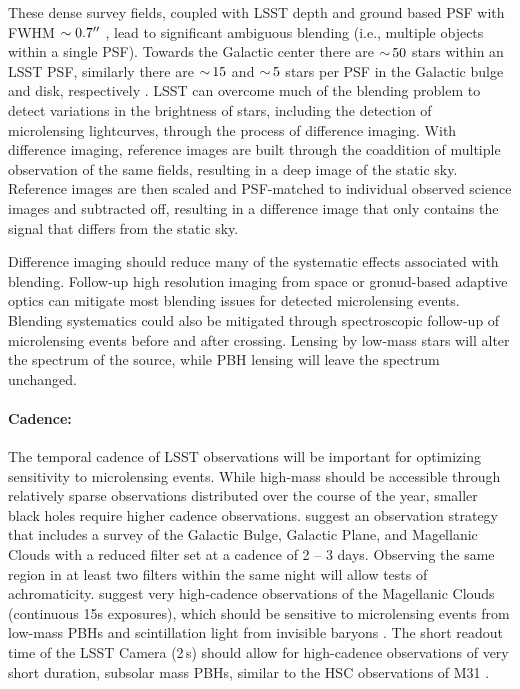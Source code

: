 These dense survey fields, coupled with LSST depth and ground based PSF with FWHM $\sim 0.7 ''$ \citep{0805.2366}, lead to significant ambiguous blending (i.e., multiple objects within a single PSF).
Towards the Galactic center there are $ {\sim}\, 50$ stars within an LSST PSF, similarly there are $ {\sim}\, 15$ and $ {\sim}\, 5$ stars per PSF in the Galactic bulge and disk, respectively \citep{1806.06372}.
LSST can overcome much of the blending problem to detect variations in the brightness of stars, including the detection of microlensing lightcurves, through the process of difference imaging.
With difference imaging, reference images are built through the coaddition of multiple observation of the same fields, resulting in a deep image of the static sky. Reference images are then scaled and PSF-matched to individual observed science images and subtracted off, resulting in a difference image that only contains the signal that differs from the static sky. 

Difference imaging should reduce many of the systematic effects associated with blending. Follow-up high resolution imaging from space or gronud-based adaptive optics can mitigate most blending issues for detected microlensing events.
Blending systematics could also be mitigated through spectroscopic follow-up of microlensing events before and after crossing. Lensing by low-mass stars will alter the spectrum of the source, while PBH lensing will leave the spectrum unchanged.

\paragraph{Cadence:} The temporal cadence of LSST observations will be important for optimizing sensitivity to microlensing events. 
While high-mass  should be accessible through relatively sparse observations distributed over the course of the year, smaller black holes require higher cadence observations.
\citep{1812.03137} suggest an observation strategy that includes a survey of the Galactic Bulge, Galactic Plane, and Magellanic Clouds with a reduced filter set at a cadence of 2 – 3 days. 
Observing the same region in at least two filters within the same night will allow tests of achromaticity.
\citet{1812.03139} suggest very high-cadence observations of the Magellanic Clouds (continuous 15s exposures), which should be sensitive to microlensing events from low-mass PBHs and scintillation light from invisible baryons \citep[\eg,][]{2003A&A...412..105M}.
The short readout time of the LSST Camera (2\,s) should allow for high-cadence observations of very short duration, subsolar mass PBHs, similar to the HSC observations of M31 \citep{1701.02151}.

